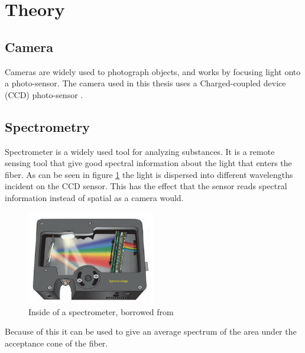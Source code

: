 \section{Theory}

\subsection{Camera}
Cameras are widely used to photograph objects, and works by focusing light onto a photo-sensor. The camera used in this thesis uses a Charged-coupled device (CCD) photo-sensor \cite{JYIVolumeThree}.

\subsection{Spectrometry}
Spectrometer is a widely used tool for analyzing substances. It is a remote sensing tool that give good spectral information about the light that enters the fiber. As can be seen in figure \ref{fig:spectrometer_inside} the light is dispersed into different wavelengths incident on the CCD sensor. This has the effect that the sensor reads spectral information instead of spatial as a camera would. 

\begin{figure}[h]
    \centering
    \includegraphics[width=0.5\textwidth]{figures/Mini-spectrometer-open-bench.png}
    \caption{Inside of a spectrometer, borrowed from \cite{KAI0340640480}}
    \label{fig:spectrometer_inside}
\end{figure}

Because of this it can be used to give an average spectrum of the area under the acceptance cone of the fiber. 

